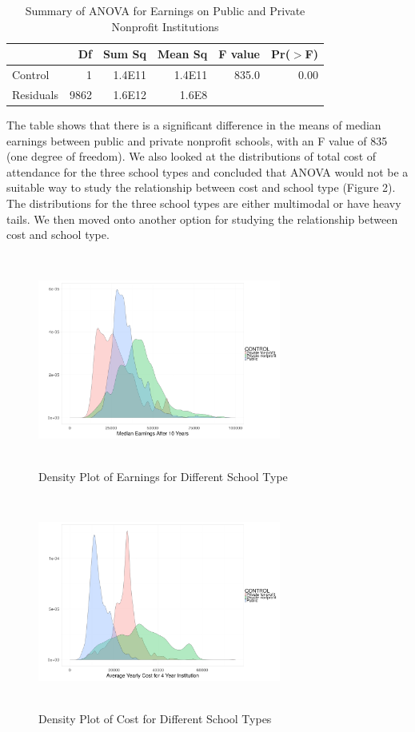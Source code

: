 \documentclass[%
 reprint,
 amsmath,amssymb,
 aps,
]{revtex4-1}
\begin{document}
\begin{table}[ht]
	\centering
	\caption{Summary of ANOVA for Earnings on Public and Private Nonprofit Institutions}
	\begin{tabular}{lrrrrr}
		  \hline
		   & Df & Sum Sq & Mean Sq & F value & Pr($>$F) \\ 
		     \hline
		     Control & 1 & 1.4E11 & 1.4E11 & 835.0 & 0.00 \\ 
		       Residuals & 9862 & 1.6E12 & 1.6E8 &  &  \\ 
		          \hline
	\end{tabular}
\end{table}


The table shows that there is a significant difference in the means of median earnings between public and private nonprofit schools, with an F value of 835 (one degree of freedom).  We also looked at the distributions of total cost of attendance for the three school types and concluded that ANOVA would not be a suitable way to study the relationship between cost and school type (Figure 2).  The distributions for the three school types are either multimodal or have heavy tails.  We then moved onto another option for studying the relationship between cost and school type.
\begin{figure}[h]
\caption{Density Plot of Earnings for Different School Type}
\includegraphics[width=8cm, height=7cm]{earnings.png}
\end{figure}

\begin{figure}[h]
\caption{Density Plot of Cost for Different School Types}
\includegraphics[width=8cm, height=7cm]{cost.png}
\end{figure}
\end{document}
